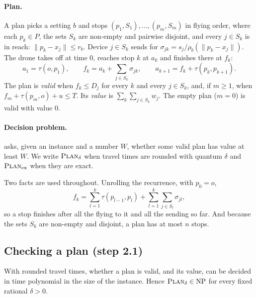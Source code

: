 \paragraph{Plan.} A plan picks a setting $b$ and stops
$(p_1,S_1),\dots,(p_m,S_m)$ in flying order, where each $p_k\in P$, the sets
$S_k$ are non-empty and pairwise disjoint, and every $j\in S_k$ is in reach:
$\lVert p_k-x_j\rVert\le r_b$. Device $j\in S_k$ sends for
$\sigma_{jk}=s_j/\rho_b(\lVert p_k-x_j\rVert)$. The drone takes off at time
$0$, reaches stop $k$ at $a_k$ and finishes there at $f_k$:
\[
  a_1=\tau(o,p_1),\qquad
  f_k=a_k+\sum_{j\in S_k}\sigma_{jk},\qquad
  a_{k+1}=f_k+\tau(p_k,p_{k+1}).
\]
The plan is \emph{valid} when $f_k\le D_j$ for every $k$ and every
$j\in S_k$, and, if $m\ge 1$, when $f_m+\tau(p_m,o)+u\le T$. Its
\emph{value} is $\sum_k\sum_{j\in S_k}w_j$. The empty plan ($m=0$) is valid
with value $0$.

\paragraph{Decision problem.} \PLAN{} asks, given an instance and a number
$W$, whether some valid plan has value at least $W$. We write $\textsc{Plan}_\delta$
when travel times are rounded with quantum $\delta$ and $\textsc{Plan}_{\mathrm{ex}}$
when they are exact.

\medskip
Two facts are used throughout. Unrolling the recurrence, with $p_0=o$,
\begin{equation}
  f_k=\sum_{l=1}^{k}\tau(p_{l-1},p_l)+\sum_{l=1}^{k}\sum_{j\in S_l}\sigma_{jl},
  \label{eq:finish}
\end{equation}
so a stop finishes after all the flying to it and all the sending so far.
And because the sets $S_k$ are non-empty and disjoint, a plan has at most
$n$ stops.

\subsection{Checking a plan (step 2.1)}
\label{sec:t1-np}

\begin{proposition}
\label{prop:np}
With rounded travel times, whether a plan is valid, and its value, can be
decided in time polynomial in the size of the instance. Hence
$\textsc{Plan}_\delta\in\mathrm{NP}$ for every fixed rational $\delta>0$.
\end{proposition}

